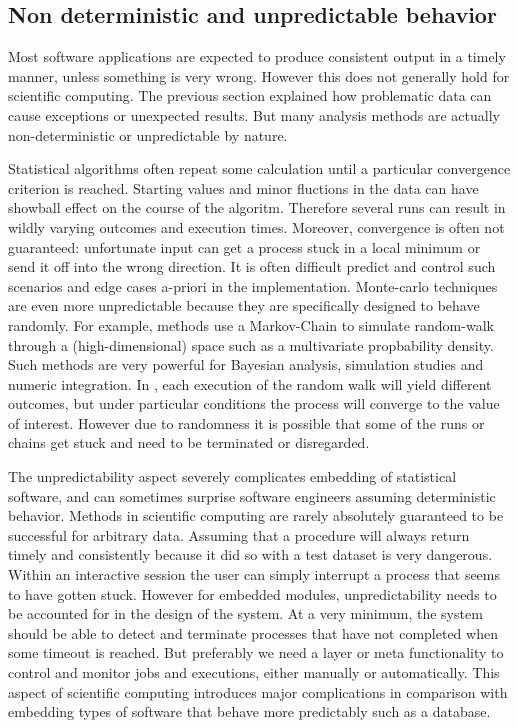 \subsection{Non deterministic and unpredictable behavior}

Most software applications are expected to produce consistent output in a timely manner, unless something is very wrong. However this does not generally hold for scientific computing. The previous section explained how problematic data can cause exceptions or unexpected results. But many analysis methods are actually non-deterministic or unpredictable by nature.

Statistical algorithms often repeat some calculation until a particular convergence criterion is reached. Starting values and minor fluctions in the data can have showball effect on the course of the algoritm. Therefore several runs can result in wildly varying outcomes and execution times. Moreover, convergence is often not guaranteed: unfortunate input can get a process stuck in a local minimum or send it off into the wrong direction. It is often difficult predict and control such scenarios and edge cases a-priori in the implementation. Monte-carlo techniques are even more unpredictable because they are specifically designed to behave randomly. For example, \MCMC methods use a Markov-Chain to simulate random-walk through a (high-dimensional) space such as a multivariate propbability density. Such methods are very powerful for Bayesian analysis, simulation studies and numeric integration. In \MCMC, each execution of the random walk will yield different outcomes, but under particular conditions the process will converge to the value of interest. However due to randomness it is possible that some of the runs or chains get stuck and need to be terminated or disregarded.

The unpredictability aspect severely complicates embedding of statistical software, and can sometimes surprise software engineers assuming deterministic behavior. Methods in scientific computing are rarely absolutely guaranteed to be successful for arbitrary data. Assuming that a procedure will always return timely and consistently because it did so with a test dataset is very dangerous. Within an interactive session the user can simply interrupt a process that seems to have gotten stuck. However for embedded modules, unpredictability needs to be accounted for in the design of the system. At a very minimum, the system should be able to detect and terminate processes that have not completed when some timeout is reached. But preferably we need a layer or meta functionality to control and monitor jobs and executions, either manually or automatically.  This aspect of scientific computing introduces major complications in comparison with embedding types of software that behave more predictably such as a database. 

